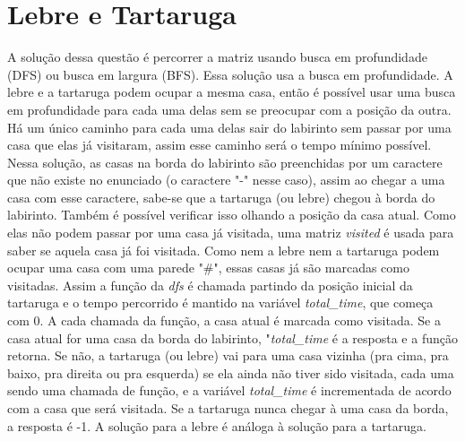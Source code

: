 \documentclass[11pt,fancychapters]{article}
\begin{document}
\section{Lebre e Tartaruga}
\noindent
A solução dessa questão é percorrer a matriz usando busca em profundidade (DFS) ou busca em largura (BFS). Essa solução usa a busca em profundidade. A lebre e a tartaruga podem ocupar a mesma casa, então é possível usar uma busca em profundidade para cada uma delas sem se preocupar com a posição da outra. Há um único caminho para cada uma delas sair do labirinto sem passar por uma casa que elas já visitaram, assim esse caminho será o tempo mínimo possível. Nessa solução, as casas na borda do labirinto são preenchidas por um caractere que não existe no enunciado (o caractere "-" nesse caso), assim ao chegar a uma casa com esse caractere, sabe-se que a tartaruga (ou lebre) chegou à borda do labirinto. Também é possível verificar isso olhando a posição da casa atual. Como elas não podem passar por uma casa já visitada, uma matriz \emph{visited} é usada para saber se aquela casa já foi visitada. Como nem a lebre nem a tartaruga podem ocupar uma casa com uma parede "\#", essas casas já são marcadas como visitadas. Assim a função da \emph{dfs} é chamada partindo da posição inicial da tartaruga e o tempo percorrido é mantido na variável \emph{total\_time}, que começa com 0. A cada chamada da função, a casa atual é marcada como visitada. Se a casa atual for uma casa da borda do labirinto, "\emph{total\_time} é a resposta e a função retorna. Se não, a tartaruga (ou lebre) vai para uma casa vizinha (pra cima, pra baixo, pra direita ou pra esquerda) se ela ainda não tiver sido visitada, cada uma sendo uma chamada de função, e a variável \emph{total\_time} é incrementada de acordo com a casa que será visitada. Se a tartaruga nunca chegar à uma casa da borda, a resposta é -1. A solução para a lebre é análoga à solução para a tartaruga.\\
\end{document}
